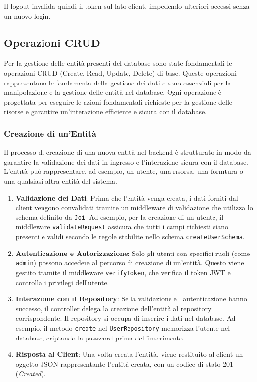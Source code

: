 \documentclass[twoside]{supsistudent}
\begin{document}
Il logout invalida quindi il token sul lato client, impedendo ulteriori accessi senza un nuovo login.

\subsection{Operazioni CRUD}

Per la gestione delle entità presenti del database sono state fondamentali le operazioni CRUD (Create, Read, Update, Delete) di base. Queste operazioni rappresentano le fondamenta della gestione dei dati e sono essenziali per la manipolazione e la gestione delle entità nel database. Ogni operazione è progettata per eseguire le azioni fondamentali richieste per la gestione delle risorse e garantire un'interazione efficiente e sicura con il database.

\subsubsection{Creazione di un'Entità}

Il processo di creazione di una nuova entità nel backend è strutturato in modo da garantire la validazione dei dati in ingresso e l'interazione sicura con il database. L'entità può rappresentare, ad esempio, un utente, una risorsa, una fornitura o una qualsiasi altra entità del sistema.

\begin{enumerate}
  \item \textbf{Validazione dei Dati}: Prima che l'entità venga creata, i dati forniti dal client vengono convalidati tramite un middleware di validazione che utilizza lo schema definito da \texttt{Joi}. Ad esempio, per la creazione di un utente, il middleware \texttt{validateRequest} assicura che tutti i campi richiesti siano presenti e validi secondo le regole stabilite nello schema \texttt{createUserSchema}.
  \item \textbf{Autenticazione e Autorizzazione}: Solo gli utenti con specifici ruoli (come \texttt{admin}) possono accedere al percorso di creazione di un'entità. Questo viene gestito tramite il middleware \texttt{verifyToken}, che verifica il token JWT e controlla i privilegi dell'utente.
  \item \textbf{Interazione con il Repository}: Se la validazione e l'autenticazione hanno successo, il controller delega la creazione dell'entità al repository corrispondente. Il repository si occupa di inserire i dati nel database. Ad esempio, il metodo \texttt{create} nel \texttt{UserRepository} memorizza l'utente nel database, criptando la password prima dell'inserimento.
  \item \textbf{Risposta al Client}: Una volta creata l'entità, viene restituito al client un oggetto JSON rappresentante l'entità creata, con un codice di stato 201 (\textit{Created}).
\end{enumerate}
\end{document}
